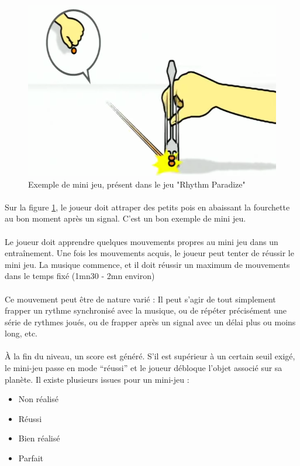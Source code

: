 \begin{figure}[H]\centering
  \includegraphics[scale=.4]{./img/rhythmParadise.png}
  \caption{Exemple de mini jeu, présent dans le jeu "Rhythm Paradize"}
  \label{rhythmParadise}
\end{figure}

\paragraph{} Sur la figure \ref{rhythmParadise}, le joueur doit attraper des petits pois en abaissant la fourchette au bon moment après un signal. C'est un bon exemple de mini jeu.

\paragraph{} Le joueur doit apprendre quelques mouvements propres au mini jeu dans un entraînement. Une fois les mouvements acquis, le joueur peut tenter de réussir le mini jeu. La musique commence, et il doit réussir un maximum de mouvements dans le temps fixé (1mn30 - 2mn environ)
\paragraph{} Ce mouvement peut être de nature varié : Il peut s’agir de tout simplement frapper un rythme synchronisé avec la musique, ou de répéter précisément une série de rythmes joués, ou de frapper après un signal avec un délai plus ou moins long, etc.



\paragraph{} À la fin du niveau, un score est généré. S’il est supérieur à un certain seuil exigé, le mini-jeu passe en mode “réussi” et le joueur débloque l’objet associé sur sa planète.
Il existe plusieurs issues pour un mini-jeu :
\begin{itemize}
\item Non réalisé
\item Réussi
\item Bien réalisé 
\item Parfait
\end{itemize}

